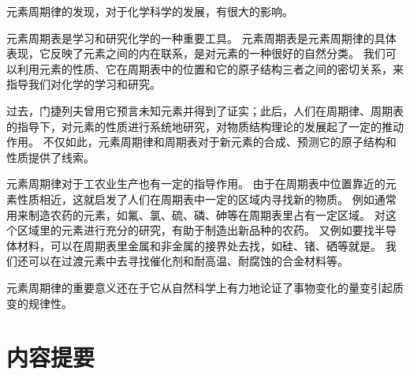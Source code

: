 元素周期律的发现，对于化学科学的发展，有很大的影响。

元素周期表是学习和研究化学的一种重要工具。
元素周期表是元素周期律的具体表现，它反映了元素之间的内在联系，是对元素的一种很好的自然分类。
我们可以利用元素的性质、它在周期表中的位置和它的原子结构三者之间的密切关系，来指导我们对化学的学习和研究。

过去，门捷列夫曾用它预言未知元素并得到了证实；此后，人们在周期律、周期表的指导下，对元素的性质进行系统地研究，对物质结构理论的发展起了一定的推动作用。
不仅如此，元素周期律和周期表对于新元素的合成、预测它的原子结构和性质提供了线索。

元素周期律对于工农业生产也有一定的指导作用。
由于在周期表中位置靠近的元素性质相近，这就启发了人们在周期表中一定的区域内寻找新的物质。
例如通常用来制造农药的元素，如氟、氯、硫、磷、砷等在周期表里占有一定区域。
对这个区域里的元素进行充分的研究，有助于制造出新品种的农药。
又例如要找半导体材料，可以在周期表里金属和非金属的接界处去找，如硅、锗、硒等就是。
我们还可以在过渡元素中去寻找催化剂和耐高温、耐腐蚀的合金材料等。

元素周期律的重要意义还在于它从自然科学上有力地论证了事物变化的量变引起质变的规律性。
\section*{内容提要}
\setcounter{subsection}{0}

